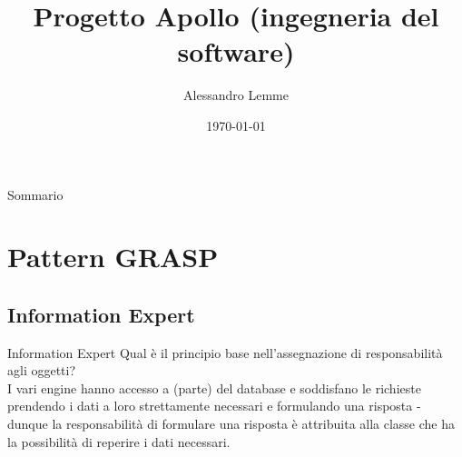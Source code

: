 \documentclass{beamer}
\title{Progetto Apollo (ingegneria del software)}
\author{Alessandro Lemme}
\institute{Università degli studi di Brescia}
\date{\today}
\begin{document}
\begin{frame}
\titlepage
\end{frame}

\begin{frame}{Sommario}
\tableofcontents
\end{frame}

\section{Pattern GRASP}

\subsection{Information Expert}
\begin{frame}{Information Expert}
Qual è il principio base nell’assegnazione di responsabilità agli oggetti? \\
\quad I vari engine hanno accesso a (parte) del database e soddisfano le richieste 
prendendo i dati a loro strettamente necessari e formulando una risposta - 
dunque la responsabilità di formulare una risposta è attribuita alla classe che
ha la possibilità di reperire i dati necessari.
\end{frame}


\end{document}
